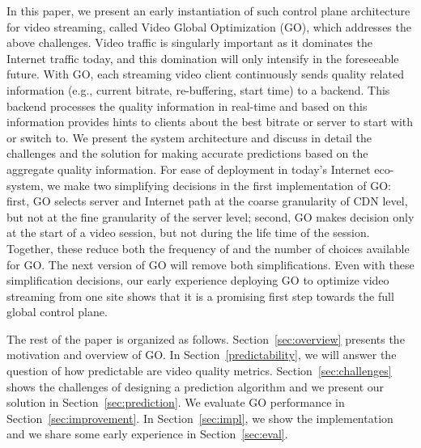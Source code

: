 In this paper, we present an early instantiation of such control plane architecture for video streaming, called Video Global Optimization (GO), which addresses the above challenges.  Video traffic is singularly important as it dominates the Internet traffic today, and this domination will only intensify in the foreseeable future. With GO, each streaming video client continuously sends quality related information (e.g., current bitrate, re-buffering, start time) to a backend. This backend processes the quality information in real-time and based on this information provides hints to clients about the best bitrate or server to start with or switch to. We present the system architecture and discuss in detail the challenges and the solution for making accurate predictions based on the aggregate quality information. For ease of deployment in today’s Internet eco-system, we make two simplifying decisions in the first implementation of GO: first, GO selects server and Internet path at the coarse granularity of CDN level, but not at the fine granularity of the server level; second, GO makes decision only at the start of a video session, but not during the life time of the session.  Together, these reduce both the frequency of and the number of choices available for GO.  The next version of GO will remove both simplifications. Even with these simplification decisions, our early experience deploying GO to optimize video streaming from one site shows that it is a promising first step towards the full global control plane. 
   
The rest of the paper is organized as follows. Section~\ref{sec:overview} presents the motivation and overview of GO. In Section~\ref{predictability}, we will answer the question of how predictable are video quality metrics. Section~\ref{sec:challenges} shows the challenges of designing a prediction algorithm and we present our solution in Section~\ref{sec:prediction}. We evaluate GO performance in Section~\ref{sec:improvement}. In Section~\ref{sec:impl}, we show the implementation and we share some early experience in Section~\ref{sec:eval}.
